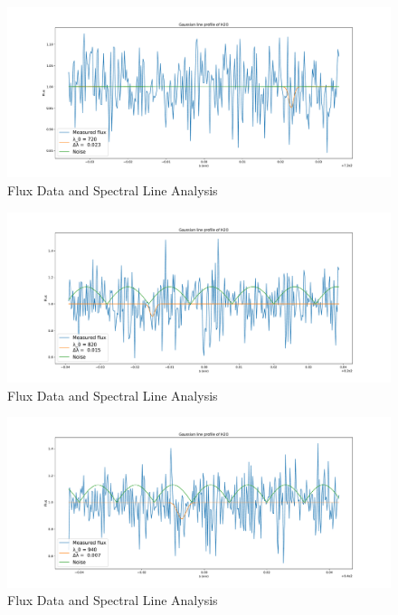 \documentclass[reprint,english,notitlepage]{revtex4-2}
\begin{document}
    \begin{figure}[h!]
      \centering
      \includegraphics[scale =.3]{Figures/H2O 720}
      \caption{Flux Data and Spectral Line Analysis}
      \label{fig: H2 720}
    \end{figure}

    \begin{figure}[h!]
      \centering
      \includegraphics[scale =.3]{Figures/H2O 820}
      \caption{Flux Data and Spectral Line Analysis}
      \label{fig: H2 820}
    \end{figure}

    \begin{figure}[h!]
      \centering
      \includegraphics[scale =.3]{Figures/H2O 940}
      \caption{Flux Data and Spectral Line Analysis}
      \label{fig: H2 940}
    \end{figure}
\end{document}
